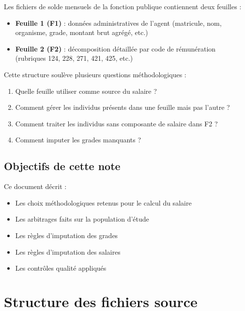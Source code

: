 \documentclass[12pt,a4paper,french]{article}
\begin{document}
Les fichiers de solde mensuels de la fonction publique contiennent deux feuilles :

\begin{itemize}
    \item \textbf{Feuille 1 (F1)} : données administratives de l'agent
          (matricule, nom, organisme, grade, montant brut agrégé, etc.)
    \item \textbf{Feuille 2 (F2)} : décomposition détaillée par code de
          rémunération (rubriques 124, 228, 271, 421, 425, etc.)
\end{itemize}

Cette structure soulève plusieurs questions méthodologiques :

\begin{enumerate}
    \item Quelle feuille utiliser comme source du salaire ?
    \item Comment gérer les individus présents dans une feuille mais pas l'autre ?
    \item Comment traiter les individus sans composante de salaire dans F2 ?
    \item Comment imputer les grades manquants ?
\end{enumerate}

\subsection{Objectifs de cette note}

Ce document décrit :

\begin{itemize}
    \item Les choix méthodologiques retenus pour le calcul du salaire
    \item Les arbitrages faits sur la population d'étude
    \item Les règles d'imputation des grades
    \item Les règles d'imputation des salaires
    \item Les contrôles qualité appliqués
\end{itemize}

\section{Structure des fichiers source}
\end{document}
